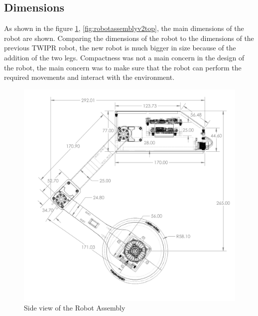 \subsection{Dimensions}
As shown in the figure \ref{fig:robotassemblyv2side}, \ref{fig:robotassemblyv2top}, the main dimensions of the robot are shown.
Comparing the dimensions of the robot to the dimensions of the previous TWIPR robot, the new robot is much bigger in size because of the addition of the two legs.
Compactness was not a main concern in the design of the robot, the main concern was to make sure that the robot can perform the required movements and interact with the environment.
\begin{figure}[h]
	\centering
	\includegraphics[width=\linewidth]{Robot_Assembly_V2_Side}
	\caption[Side view of the Robot Assembly]{Side view of the Robot Assembly}
	\label{fig:robotassemblyv2side}
\end{figure}
\vspace{4cm}
